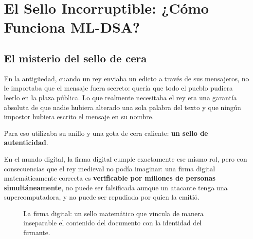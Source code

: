 \chapter{El Sello Incorruptible: ¿Cómo Funciona ML-DSA?}
\label{cap:mldsa_sello}

\section{El misterio del sello de cera}

En la antigüedad, cuando un rey enviaba un edicto a través de sus mensajeros, no le importaba que el mensaje fuera secreto: quería que todo el pueblo pudiera leerlo en la plaza pública. Lo que realmente necesitaba el rey era una garantía absoluta de que nadie hubiera alterado una sola palabra del texto y que ningún impostor hubiera escrito el mensaje en su nombre.

Para eso utilizaba su anillo y una gota de cera caliente: \textbf{un sello de autenticidad}.

En el mundo digital, la firma digital cumple exactamente ese mismo rol, pero con consecuencias que el rey medieval no podía imaginar: una firma digital matemáticamente correcta es \textbf{verificable por millones de personas simultáneamente}, no puede ser falsificada aunque un atacante tenga una supercomputadora, y no puede ser repudiada por quien la emitió.

\begin{figure}[htbp]
\centering
{}
\caption{La firma digital: un sello matemático que vincula de manera inseparable el contenido del documento con la identidad del firmante.}
\label{fig:firma_digital}
\end{figure}

